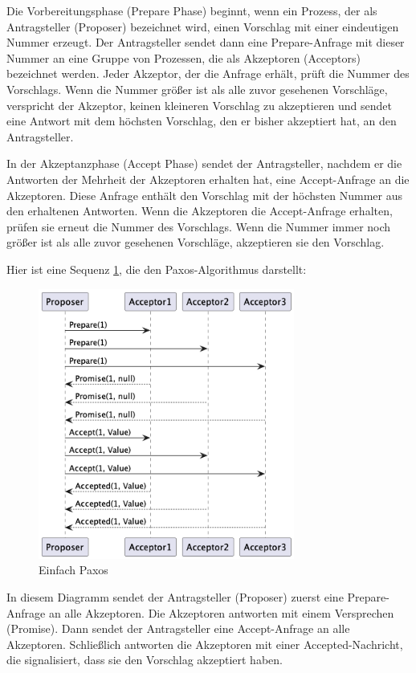 Die Vorbereitungsphase (Prepare Phase) beginnt, wenn ein Prozess, der als Antragsteller (Proposer) bezeichnet wird, einen Vorschlag mit einer eindeutigen Nummer erzeugt. Der Antragsteller sendet dann eine Prepare-Anfrage mit dieser Nummer an eine Gruppe von Prozessen, die als Akzeptoren (Acceptors) bezeichnet werden. Jeder Akzeptor, der die Anfrage erhält, prüft die Nummer des Vorschlags. Wenn die Nummer größer ist als alle zuvor gesehenen Vorschläge, verspricht der Akzeptor, keinen kleineren Vorschlag zu akzeptieren und sendet eine Antwort mit dem höchsten Vorschlag, den er bisher akzeptiert hat, an den Antragsteller.

In der Akzeptanzphase (Accept Phase) sendet der Antragsteller, nachdem er die Antworten der Mehrheit der Akzeptoren erhalten hat, eine Accept-Anfrage an die Akzeptoren. Diese Anfrage enthält den Vorschlag mit der höchsten Nummer aus den erhaltenen Antworten. Wenn die Akzeptoren die Accept-Anfrage erhalten, prüfen sie erneut die Nummer des Vorschlags. Wenn die Nummer immer noch größer ist als alle zuvor gesehenen Vorschläge, akzeptieren sie den Vorschlag.

Hier ist eine Sequenz \ref{fig:simple-paxos}, die den Paxos-Algorithmus darstellt:

\begin{figure}[!ht]
  \centering
  \includegraphics[width=0.75\textwidth]{fig/uml/paxos-default}
  \caption{Einfach Paxos}
  \label{fig:simple-paxos}
\end{figure}


In diesem Diagramm sendet der Antragsteller (Proposer) zuerst eine Prepare-Anfrage an alle Akzeptoren. Die Akzeptoren antworten mit einem Versprechen (Promise). Dann sendet der Antragsteller eine Accept-Anfrage an alle Akzeptoren. Schließlich antworten die Akzeptoren mit einer Accepted-Nachricht, die signalisiert, dass sie den Vorschlag akzeptiert haben.

